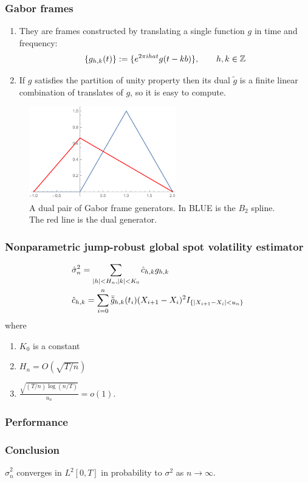 \documentclass[fleqn]{beamer}
\begin{document}
\begin{frame}[allowframebreaks]
  \frametitle{Gabor frames}
  \begin{enumerate}
    \item They are frames constructed by translating a single function $g$ in time and frequency:
      \begin{align}
        \{g_{h,k}(t) \} :=  \{e^{2\pi i h a t}g(t -k b)\}, \qquad h, k \in \mathbb{Z} \notag
        \label{}
      \end{align}
    \item If $g$ satisfies the partition of unity property then its dual  $\tilde{g}$ is a finite linear combination of translates of $g$, so it is easy to compute.
  \end{enumerate}   
  \framebreak
  \begin{figure}
  \begin{center}
  \includegraphics[width=6.4cm]{DualPair}
  \caption{A dual pair of Gabor frame generators. In BLUE is the $B_2$ spline. The red line is the dual generator.}
\end{center}
\end{figure}
\end{frame}
\begin{frame}
  \frametitle{Nonparametric jump-robust global spot volatility estimator}
\begin{align}
  &\hat{\sigma}^2_n  = \sum_{\vert h \vert < H_n, \vert k\vert < K_0 } \hat{c}_{h,k} g_{h,k}\notag\\
  &\hat{c}_{h,k} = \sum^n_{i = 0} \bar{\tilde{g}}_{h,k}(t_i)(X_{i +1} - X_i)^2I_{\{\vert X_{i + 1} - X_i\vert < u_n\}} 
        \label{}
      \end{align}
      where 
      \begin{enumerate}
        \item 
          $K_0$ is a constant
        \item
      $H_n = O(\sqrt{T/n})$
    \item
      $\frac{\sqrt{(T/n) \log(n/T)}}{u_n} = o(1)$.
      \end{enumerate}
      
\end{frame}
\begin{frame}[allowframebreaks]
  \frametitle{Performance}
  \normalsize{
    }
    \framebreak
  \normalsize{
    }
  \tiny{
    }
    \normalsize
\end{frame}
\begin{frame}
  \frametitle{Conclusion}
  \begin{theorem}
    $\hat{\sigma}^2_n$ converges in $L^2[0, T]$ in probability to $\sigma^2$ as $n \to \infty$.
      \end{theorem}
\end{frame}
\end{document}
